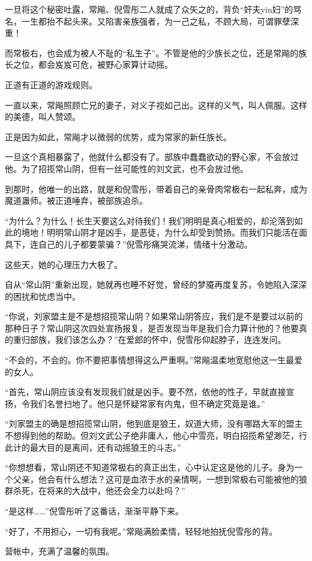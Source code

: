 \begin{this_body}
一旦将这个秘密吐露，常飚、倪雪彤二人就成了众矢之的，背负“奸夫yin妇”的骂名，一生都抬不起头来。又陷害亲族强者，为一己之私，不顾大局，可谓罪孽深重！

而常极右，也会成为被人不耻的“私生子”。不管是他的少族长之位，还是常飚的族长之位，都会岌岌可危，被野心家算计动摇。

正道有正道的游戏规则。

一直以来，常飚照顾亡兄的妻子，对义子视如己出。这样的义气，叫人佩服。这样的美德，叫人赞颂。

正是因为如此，常飚才以微弱的优势，成为常家的新任族长。

一旦这个真相暴露了，他就什么都没有了。部族中蠢蠢欲动的野心家，不会放过他。为了招揽常山阴，但有一丝可能性的刘文武，也不会放过他。

到那时，他唯一的出路，就是和倪雪彤，带着自己的亲骨肉常极右一起私奔，成为魔道蛊师。被正道唾弃，被部族追杀。

“为什么？为什么！长生天要这么对待我们！我们明明是真心相爱的，却沦落到如此的境地！明明常山阴才是凶手，是恶徒，为什么却受到赞扬。而我们只能活在面具下，连自己的儿子都要蒙骗？”倪雪彤痛哭流涕，情绪十分激动。

这些天，她的心理压力大极了。

自从“常山阴”重新出现，她就再也睡不好觉，曾经的梦魇再度复苏，令她陷入深深的困扰和忧虑当中。

“你说，刘家盟主是不是想招揽常山阴？如果常山阴答应，我们是不是要过以前的那种日子？常山阴这次四处宣扬报复，是否发现当年是我们合力算计他的？他要真的重归部族，我们该怎么办？”在爱郎的怀中，倪雪彤仰起脖子，连连发问。

“不会的，不会的。你不要把事情想得这么严重啊。”常飚温柔地宽慰他这一生最爱的女人。

“首先，常山阴应该没有发现我们就是凶手。要不然，依他的性子，早就直接宣扬，令我们名誉扫地了。他只是怀疑常家有内鬼，但不确定究竟是谁。”

“刘家盟主的确是想招揽常山阴，他到底是狼王，奴道大师，没有哪路大军的盟主不想得到他的帮助。但刘文武公子绝非庸人，他心中雪亮，明白招揽希望渺茫，行此计的最大目的是离间，还有动摇狼王的斗志。”

“你想想看，常山阴还不知道常极右的真正出生，心中认定这是他的儿子。身为一个父亲，他会有什么想法？这可是血浓于水的亲情啊，一想到常极右可能被他的狼群杀死，在将来的大战中，他还会全力以赴吗？”

“是这样……”倪雪彤听了这番话，渐渐平静下来。

“好了，不用担心，一切有我呢。”常飚满脸柔情，轻轻地拍抚倪雪彤的背。

营帐中，充满了温馨的氛围。


\end{this_body}

